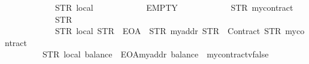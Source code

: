\begin{isabellebody}
\ \ \ \ \ \ \ \ \ \ \ \ {\isacharparenleft}{\kern0pt}STR\ {\isacharprime}{\kern0pt}{\isacharprime}{\kern0pt}local{\isacharprime}{\kern0pt}{\isacharprime}{\kern0pt}{\isacharparenright}{\kern0pt}\isanewline
\ \ \ \ \ \ \ \ \ \ \ \ EMPTY\isanewline
\ \ \ \ \ \ \ \ \ \ \ \ {\isacharparenleft}{\kern0pt}STR\ {\isacharprime}{\kern0pt}{\isacharprime}{\kern0pt}mycontract{\isacharprime}{\kern0pt}{\isacharprime}{\kern0pt}{\isacharparenright}{\kern0pt}\isanewline
\ \ \ \ \ \ \ \ \ \ \ \ {\isacharparenleft}{\kern0pt}STR\ {\isacharprime}{\kern0pt}{\isacharprime}{\kern0pt}{}{\isacharprime}{\kern0pt}{\isacharprime}{\kern0pt}{\isacharparenright}{\kern0pt}\isanewline
\ \ \ \ \ \ \ \ \ \ \ \ {\isacharbrackleft}{\kern0pt}{\isacharparenleft}{\kern0pt}STR\ {\isacharprime}{\kern0pt}{\isacharprime}{\kern0pt}local{\isacharprime}{\kern0pt}{\isacharprime}{\kern0pt}{\isacharcomma}{\kern0pt}\ STR\ {\isacharprime}{\kern0pt}{\isacharprime}{\kern0pt}{}{}{}{\isacharprime}{\kern0pt}{\isacharprime}{\kern0pt}{\isacharcomma}{\kern0pt}\ EOA{\isacharcomma}{\kern0pt}\ {}{\isacharparenright}{\kern0pt}{\isacharcomma}{\kern0pt}\ {\isacharparenleft}{\kern0pt}STR\ {\isacharprime}{\kern0pt}{\isacharprime}{\kern0pt}myaddr{\isacharprime}{\kern0pt}{\isacharprime}{\kern0pt}{\isacharcomma}{\kern0pt}\ STR\ {\isacharprime}{\kern0pt}{\isacharprime}{\kern0pt}{}{}{}{\isacharprime}{\kern0pt}{\isacharprime}{\kern0pt}{\isacharcomma}{\kern0pt}\ Contract\ {\isacharparenleft}{\kern0pt}STR\ {\isacharprime}{\kern0pt}{\isacharprime}{\kern0pt}mycontract{\isacharprime}{\kern0pt}{\isacharprime}{\kern0pt}{\isacharparenright}{\kern0pt}{\isacharcomma}{\kern0pt}\ {}{\isacharparenright}{\kern0pt}{\isacharbrackright}{\kern0pt}\isanewline
\ \ \ \ \ \ \ \ \ \ \ \ {\isacharbrackleft}{\kern0pt}{\isacharbrackright}{\kern0pt}\isanewline
\ \ \ \ \ \ \ \ {\isacharequal}{\kern0pt}\ STR\ {\isacharprime}{\kern0pt}{\isacharprime}{\kern0pt}local{\isacharcolon}{\kern0pt}\ balance{\isacharequal}{\kern0pt}{\isacharequal}{\kern0pt}{}{}{}\ {\isacharminus}{\kern0pt}\ EOA{\isasymnewline}myaddr{\isacharcolon}{\kern0pt}\ balance{\isacharequal}{\kern0pt}{\isacharequal}{\kern0pt}{}{}{}\ {\isacharminus}{\kern0pt}\ mycontract{\isacharparenleft}{\kern0pt}v{}{\isacharequal}{\kern0pt}{\isacharequal}{\kern0pt}false{\isasymnewline}{\isacharparenright}{\kern0pt}{\isacharprime}{\kern0pt}{\isacharprime}{\kern0pt}{\isachardoublequoteclose}\isanewline
%
\isadelimproof
\ \ %

\end{isabellebody}
